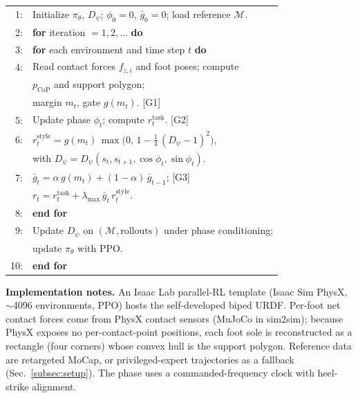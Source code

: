 \documentclass[conference]{IEEEtran}
\begin{document}
\begin{algorithm}[t]
  \caption{SG-AMP training (PPO, simulation only).}
  \label{alg:sgamp}
  \begin{center}
  \small
  \renewcommand{\arraystretch}{1.1}
  \begin{tabular}{@{}r@{\hspace{0.9em}}l@{}}
    1: & Initialize $\pi_\theta$, $D_\psi$; $\phi_0{=}0$, $\bar g_0{=}0$; load reference $\mathcal{M}$. \\
    2: & \textbf{for} iteration $=1,2,\dots$ \textbf{do} \\
    3: & \quad \textbf{for} each environment and time step $t$ \textbf{do} \\
    4: & \quad\quad Read contact forces $f_{z,i}$ and foot poses; compute \\
       & \quad\quad\quad $p_{\mathrm{CoP}}$ and support polygon; \\
       & \quad\quad\quad margin $m_t$, gate $g(m_t)$. \hfill [G1] \\
    5: & \quad\quad Update phase $\phi_t$; compute $r^{\mathrm{task}}_t$. \hfill [G2] \\
    6: & \quad\quad $r^{\mathrm{style}}_t = g(m_t)\,\max\big(0,\,1-\tfrac14\,(D_\psi-1)^2\big)$, \\
       & \quad\quad\quad with $D_\psi = D_\psi(s_t,s_{t+1},\cos\phi_t,\sin\phi_t)$. \\
    7: & \quad\quad $\bar g_t = \alpha\,g(m_t)+(1-\alpha)\,\bar g_{t-1}$; \hfill [G3] \\
       & \quad\quad $r_t = r^{\mathrm{task}}_t + \lambda_{\max}\,\bar g_t\,r^{\mathrm{style}}_t$. \\
    8: & \quad \textbf{end for} \\
    9: & Update $D_\psi$ on $(\mathcal{M},\text{rollouts})$ under phase conditioning; \\
       & update $\pi_\theta$ with PPO. \\
    10: & \textbf{end for} \\
  \end{tabular}
  \end{center}
\end{algorithm}

\noindent\textbf{Implementation notes.}
An Isaac Lab parallel-RL template (Isaac Sim PhysX, $\sim$4096 environments, PPO) hosts the self-developed biped URDF. Per-foot net contact forces come from PhysX contact sensors (MuJoCo in sim2sim); because PhysX exposes no per-contact-point positions, each foot sole is reconstructed as a rectangle (four corners) whose convex hull is the support polygon. Reference data are retargeted MoCap, or privileged-expert trajectories as a fallback (Sec.~\ref{subsec:setup}). The phase uses a commanded-frequency clock with heel-strike alignment.
\end{document}
